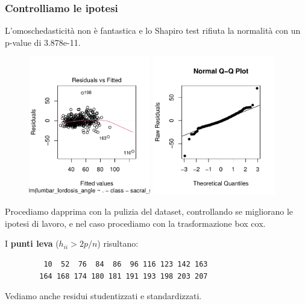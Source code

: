 \documentclass{beamer}
\begin{document}
\begin{frame}
	\frametitle{Controlliamo le ipotesi}
	L'omoschedasticità non è fantastica e lo Shapiro test rifiuta la normalità con un p-value di 3.878e-11.
	\begin{figure}
	   \includegraphics[width=0.475\textwidth]{02omoschedasticita}
	   \hfill
	   \includegraphics[width=0.475\textwidth]{03qqplot}
	\end{figure}
\end{frame}




\begin{frame}[fragile]
	Procediamo dapprima con la pulizia del dataset, controllando se migliorano le ipotesi di lavoro, e nel caso procediamo con la trasformazione box cox.
	
	\vspace*{1cm}
	I \textbf{punti leva} ($h_{ii}>2p/n$) risultano:

	\begin{verbatim}
		 10  52  76  84  86  96 116 123 142 163
		164 168 174 180 181 191 193 198 203 207
	\end{verbatim}

	\vspace*{1cm}
	Vediamo anche residui studentizzati e standardizzati.
\end{frame}
\end{document}
